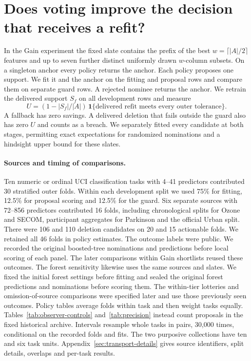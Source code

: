 \section{Does voting improve the decision that receives a refit?}
\label{sec:transport}
In the Gain experiment the fixed slate contains the prefix of the best $w=\lceil |A|/2\rceil$ features and up to seven further distinct uniformly drawn $w$-column subsets. On a singleton anchor every policy returns the anchor. Each policy proposes one support. We fit it and the anchor on the fitting and proposal rows and compare them on separate guard rows. A rejected nominee returns the anchor. We retrain the delivered support $S_f$ on all development rows and measure
\begin{equation}
 U=(1-|S_f|/|A|)\,\mathbf 1\{\text{delivered refit meets every outer tolerance}\}.
 \label{eq:utility}
\end{equation}
A fallback has zero savings. A delivered deletion that fails outside the guard also has zero $U$ and counts as a breach. We separately fitted every candidate at both stages, permitting exact expectations for randomized nominations and a hindsight upper bound for these slates.

\paragraph{Sources and timing of comparisons.}
Ten numeric or ordinal UCI classification tasks with 4--41 predictors contributed 30 stratified outer folds. Within each development split we used 75\% for fitting, 12.5\% for proposal scoring and 12.5\% for the guard. Six separate sources with 72--856 predictors contributed 16 folds, including chronological splits for Ozone and SECOM, participant aggregates for Parkinson and the official Urban split. There were 106 and 110 deletion candidates on 20 and 15 actionable folds. We retained all 46 folds in policy estimates. The outcome labels were public. We recorded the original boosted-tree nominations and predictions before local scoring of each panel. The later comparisons within Gain shortlists reused these outcomes. The forest sensitivity likewise uses the same sources and slates. We fixed the initial forest settings before fitting and sealed the original forest predictions and nominations before scoring them. The within-tier lotteries and omission-of-source comparisons were specified later and use those previously seen outcomes. Policy tables average folds within task and then weight tasks equally. Tables~\ref{tab:observer-controls} and~\ref{tab:precision} instead count proposals in the fixed historical archive. Intervals resample whole tasks in pairs, 30,000 times, conditional on the recorded folds and fits. The two purposive collections have ten and six task units. Appendix~\ref{sec:transport-details} gives source identifiers, split details, overlaps and per-task results.

